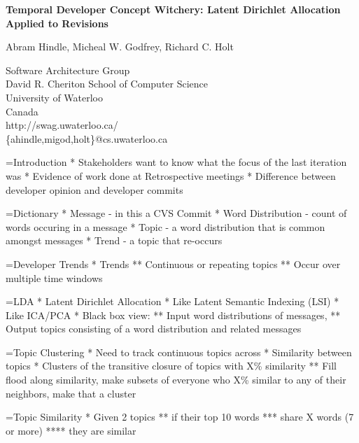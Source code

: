 \documentclass[titlepage,usenames,a4,landscape,semhelv]{seminar}
\author{
\names \\ 
{\small Software Architecture Group }\\
\small David R. Cheriton School of Computer Science\\
\small University of Waterloo\\
\small Canada\\
ahindle@cs.uwaterloo.ca
}
\newcommand{\gettitle}{Temporal Developer Concept Witchery: Latent Dirichlet Allocation Applied to Revisions}
\newcommand{\gettitleproper}{\gettitle}
\newcommand{\names}{Abram Hindle, Micheal W. Godfrey, Richard C. Holt}
\begin{document}
\pagestyle{fancy} %
\begin{slide}

\begin{center}
{\bf \LARGE \gettitleproper }

{\names } 

{\small Software Architecture Group }\\[-.5em]
{\small David R. Cheriton School of Computer Science}\\[-.5em]
{\small University of Waterloo}\\[-.5em]
{\small Canada}\\[-.5em]
{\small http://swag.uwaterloo.ca/}\\
\{ahindle,migod,holt\}@cs.uwaterloo.ca


\end{center}

=Introduction
* Stakeholders want to know what the focus of the last iteration was
* Evidence of work done at Retrospective meetings
* Difference between developer opinion and developer commits


=Dictionary
* Message - in this a CVS Commit
* Word Distribution - count of words occuring in a message
* Topic - a word distribution that is common amongst messages
* Trend - a topic that re-occurs


=Developer Trends
* Trends
** Continuous or repeating topics
** Occur over multiple time windows

=LDA
* Latent Dirichlet Allocation
* Like Latent Semantic Indexing (LSI)
* Like ICA/PCA
* Black box view:
** Input word distributions of messages, 
** Output topics consisting of a word distribution and related messages



=Topic Clustering 
* Need to track continuous topics across 
* Similarity between topics
* Clusters of the transitive closure of topics with X\% similarity
** Fill flood along similarity, make subsets of everyone who X\% similar to any of their neighbors, make that a cluster




=Topic Similarity
* Given 2 topics
** if their top 10 words 
*** share X words (7 or more)
****  they are similar






\end{slide}
\end{document}
